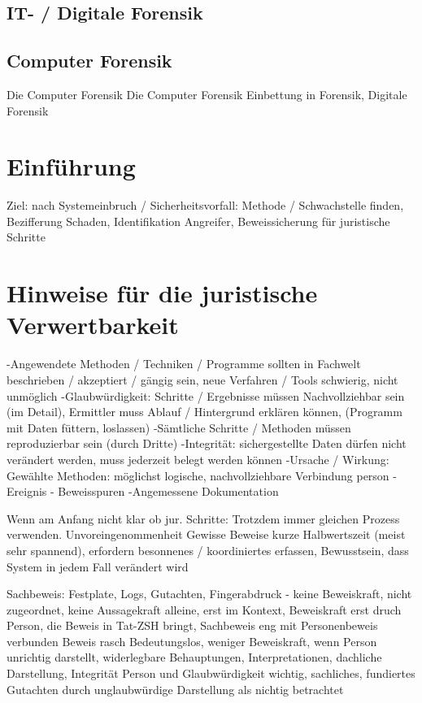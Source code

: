 \subsection{IT- / Digitale Forensik}

\subsection{Computer Forensik}
Die Computer Forensik
Die Computer Forensik
Einbettung in Forensik, Digitale Forensik


\section{Einführung}
Ziel: nach Systemeinbruch / Sicherheitsvorfall: Methode / Schwachstelle finden, Bezifferung Schaden, Identifikation Angreifer, Beweissicherung für juristische Schritte

\section{Hinweise für die juristische Verwertbarkeit}
-Angewendete Methoden / Techniken / Programme sollten in Fachwelt beschrieben / akzeptiert / gängig sein, neue Verfahren / Tools schwierig, nicht unmöglich
-Glaubwürdigkeit: Schritte / Ergebnisse müssen Nachvollziehbar sein (im Detail), Ermittler muss Ablauf / Hintergrund erklären können, (Programm mit Daten füttern, loslassen)
-Sämtliche Schritte / Methoden müssen reproduzierbar sein (durch Dritte)
-Integrität: sichergestellte Daten dürfen nicht verändert werden, muss jederzeit belegt werden können
-Ursache / Wirkung: Gewählte Methoden: möglichst logische, nachvollziehbare Verbindung person - Ereignis - Beweisspuren
-Angemessene Dokumentation


Wenn am Anfang nicht klar ob jur. Schritte: Trotzdem immer gleichen Prozess verwenden.
Unvoreingenommenheit
Gewisse Beweise kurze Halbwertszeit (meist sehr spannend), erfordern besonnenes / koordiniertes erfassen, Bewusstsein, dass System in jedem Fall verändert wird

Sachbeweis: Festplate, Logs, Gutachten, Fingerabdruck - keine Beweiskraft, nicht zugeordnet, keine Aussagekraft alleine, erst im Kontext, Beweiskraft erst druch Person, die Beweis in Tat-ZSH bringt, Sachbeweis eng mit Personenbeweis verbunden
Beweis rasch Bedeutungslos, weniger Beweiskraft, wenn Person unrichtig darstellt, widerlegbare Behauptungen, Interpretationen, dachliche Darstellung, Integrität Person und Glaubwürdigkeit wichtig, sachliches, fundiertes Gutachten durch unglaubwürdige Darstellung als nichtig betrachtet

